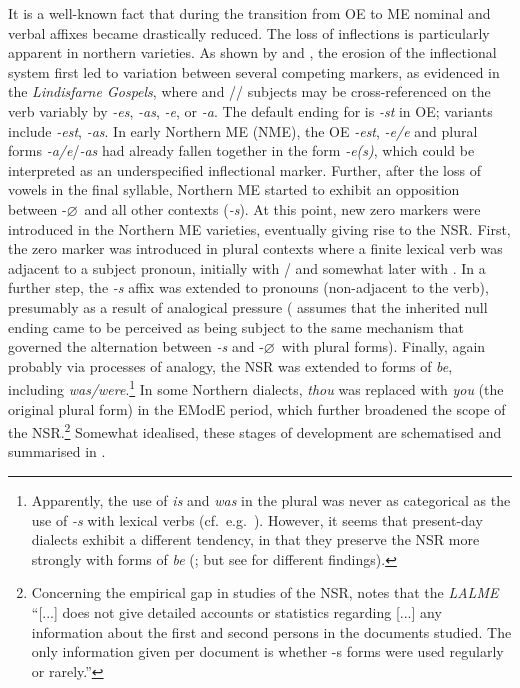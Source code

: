 \documentclass[output=paper]{langsci/langscibook}
\begin{document}
It is a well-known fact that during the transition from \gls{OE} to \gls{ME}
nominal and verbal affixes became drastically reduced. The loss of inflections
is particularly apparent in northern varieties. As shown by \cite{Berndt1956}
and \cite{Cole2014}, the erosion of the inflectional system first led to
variation between several competing  markers, as evidenced in the
\emph{Lindisfarne Gospels}, where \Tsg{} and \Fpl{}/\Spl{}/\Tpl{} subjects may
be cross-referenced on the verb variably by \emph{-es}, \emph{-as},
\emph{-e\dh}, or \emph{-a\dh}. The default ending for \Ssg{} is \emph{-st} in
\gls{OE}; variants include \emph{-est}, \emph{-as}. In early Northern ME
(\gls{NME}), the \gls{OE} \Ssg{}  \emph{-est}, \Tsg{} \emph{-e/{\dh}e} and plural
forms \emph{-a/{\dh}e}/\emph{-as} had already fallen together in the form
\emph{-e(s)}, which could be interpreted as an underspecified inflectional
marker. Further, after the loss of vowels in the final syllable, Northern ME
started to exhibit an opposition between \Fsg{} -$\varnothing$\ and all other contexts
(\emph{-s}). At this point, new zero markers were introduced in the Northern ME
varieties, eventually giving rise to the \gls{NSR}. First, the zero marker was
introduced in plural contexts where a finite lexical verb was adjacent to a
subject pronoun, initially with \Fpl/\Spl{} and somewhat later with \Tpl{}. In
a further step, the \emph{-s} affix was extended to \Fsg{} pronouns
(non-adjacent to the verb), presumably as a result of analogical pressure
(\citealt{Holmqvist:1922} assumes that the inherited null \Fsg{} ending came to
be perceived as being subject to the same mechanism that governed the
alternation between \emph{-s} and -$\varnothing$\ with plural forms).  Finally, again
probably via processes of analogy, the \gls{NSR} was extended to forms of
\emph{be}, including \emph{was/were}.\footnote{Apparently, the use of \emph{is}
    and \emph{was} in the plural was never as categorical as the use of
    \emph{-s} with lexical verbs (cf.\ e.g.\ \citealt{Montgomery:1994}). However, it
    seems that present-day dialects exhibit a different tendency, in that they
    preserve the \gls{NSR} more strongly with forms of \emph{be}
    (\citealt[12--13]{Pietsch:2005b}; but see \citealt{Buchstaller_etal:2013} for
different findings).} In some Northern dialects, \Ssg{} \emph{thou} was
replaced with \emph{you} (the original plural form) in the \gls{EModE} period,
which further broadened the scope of the \gls{NSR}.\footnote{Concerning the
    empirical gap in studies of the \gls{NSR}, \textcite[46]{Pietsch:2005b}
    notes that the \emph{LALME} \parencite{McIntosh2013} ``[...] does not give
    detailed accounts or statistics regarding [...] any information about the
    first and second persons in the documents studied. The only information
    given per document is whether -s forms were used regularly or rarely.''}
    Somewhat idealised, these stages of development are schematised and
    summarised in .
\end{document}
